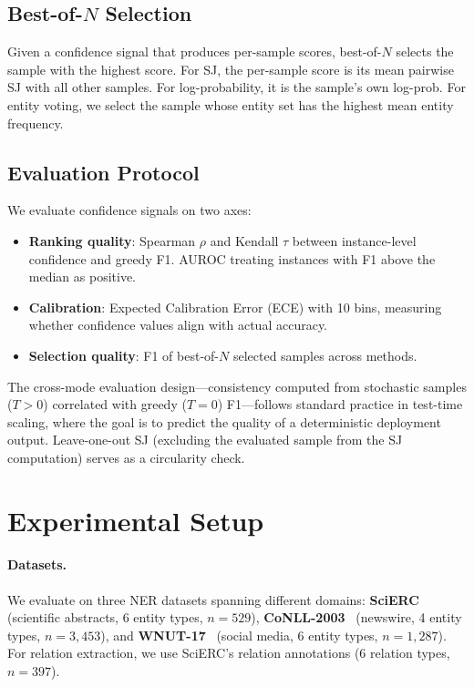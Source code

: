 \documentclass[11pt,a4paper]{article}
\begin{document}
\subsection{Best-of-$N$ Selection}
Given a confidence signal that produces per-sample scores, best-of-$N$ selects the sample with the highest score. For SJ, the per-sample score is its mean pairwise SJ with all other samples. For log-probability, it is the sample's own log-prob. For entity voting, we select the sample whose entity set has the highest mean entity frequency.

\subsection{Evaluation Protocol}
We evaluate confidence signals on two axes:
\begin{itemize}
\item \textbf{Ranking quality}: Spearman $\rho$ and Kendall $\tau$ between instance-level confidence and greedy F1. AUROC treating instances with F1 above the median as positive.
\item \textbf{Calibration}: Expected Calibration Error (ECE) with 10 bins, measuring whether confidence values align with actual accuracy.
\item \textbf{Selection quality}: F1 of best-of-$N$ selected samples across methods.
\end{itemize}

The cross-mode evaluation design---consistency computed from stochastic samples ($T > 0$) correlated with greedy ($T{=}0$) F1---follows standard practice in test-time scaling, where the goal is to predict the quality of a deterministic deployment output. Leave-one-out SJ (excluding the evaluated sample from the SJ computation) serves as a circularity check.

\section{Experimental Setup}
\label{sec:setup}

\paragraph{Datasets.}
We evaluate on three NER datasets spanning different domains: \textbf{SciERC}~\cite{luan2018multi} (scientific abstracts, 6 entity types, $n{=}529$), \textbf{CoNLL-2003}~\cite{tjong2003introduction} (newswire, 4 entity types, $n{=}3{,}453$), and \textbf{WNUT-17}~\cite{derczynski2017results} (social media, 6 entity types, $n{=}1{,}287$). For relation extraction, we use SciERC's relation annotations (6 relation types, $n{=}397$).
\end{document}
